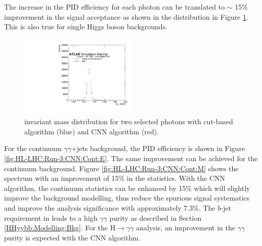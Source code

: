 The increase in the PID efficiency for each photon can be translated to $\sim$ 15\% improvement in the signal acceptance as shown in the \myy distribution in Figure \ref{fig:HL-LHC:Run-3:CNN:M}. This is also true for single Higgs boson backgrounds.\\
 
\begin{figure}[htbp]
    \centering
    \includegraphics[width=0.5\textwidth]{Ch6/Img/Eff_Tight_All_Inclusive_Tight_M_Sig.pdf}
     \begin{tcolorbox}[colback=black!5!white, colframe=white!75!black]
    \caption{\myy invariant mass distribution for two selected photons with cut-based algorithm (blue) and CNN algorithm (red).}
    \label{fig:HL-LHC:Run-3:CNN:M}
    \end{tcolorbox}
\end{figure}

For the continuum $\gamma\gamma$+jets background, the PID efficiency is shown in Figure \ref{fig:HL-LHC:Run-3:CNN:Cont:E}. The same improvement can be achieved for the continuum background. Figure \ref{fig:HL-LHC:Run-3:CNN:Cont:M} shows the \myy spectrum with an improvement of 15\% in the statistics. With the CNN algorithm, the continuum statistics can be enhanced by 15\% which will slightly improve the background modelling, thus reduce the spurious signal systematics and improve the analysis significance with approximately 7.3\%. The $b$-jet requirement in \HHyybb leads to a high $\gamma\gamma$ purity as described in Section \ref{HHyybb:Modelling:Bkg}. For the H$\to\gamma\gamma$ analysis, an improvement in the $\gamma\gamma$ purity is expected with the CNN algorithm.

